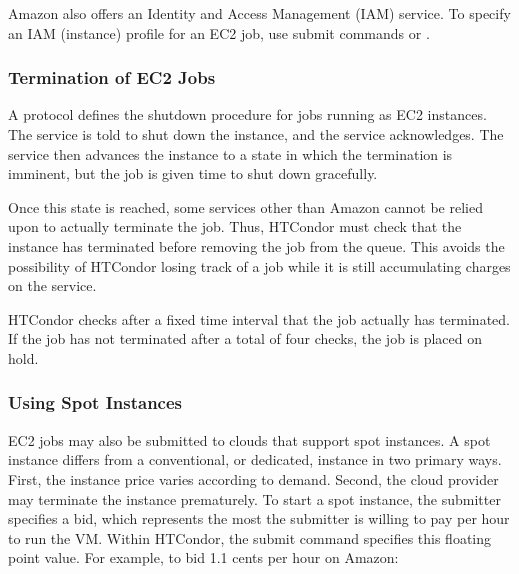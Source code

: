 Amazon also offers an Identity and Access Management (IAM) service.
To specify an IAM (instance) profile for an EC2 job, 
use submit commands
 or .

\subsubsection{\label{sec:EC2-termination}Termination of EC2 Jobs}

A protocol defines the shutdown procedure for jobs running as
EC2 instances.
The service is told to shut down the instance,
and the service acknowledges.
The service then advances the instance to a state in which
the termination is imminent, but the job is given time to
shut down gracefully.

Once this state is reached, some services other than Amazon cannot be
relied upon to actually terminate the job.
Thus, HTCondor must check that the instance has terminated
before removing the job from the queue.
This avoids the possibility of HTCondor losing track of a job
while it is still accumulating charges on the service.  

HTCondor checks after a fixed time interval
that the job actually has terminated.
If the job has not terminated after a total of four checks,
the job is placed on hold.

\subsubsection{\label{sec:spot-instances}Using Spot Instances}

EC2 jobs may also be submitted to clouds that support spot instances.
A spot instance differs from a conventional, or dedicated, instance in two
primary ways.
First, the instance price varies according to demand.
Second,
the cloud provider may terminate the instance prematurely.
To start a spot instance,
the submitter specifies a bid,
which represents the most the submitter is willing to pay per hour
to run the VM.
Within HTCondor, the submit command 
specifies this floating point value.
For example, 
to bid 1.1 cents per hour on Amazon:

